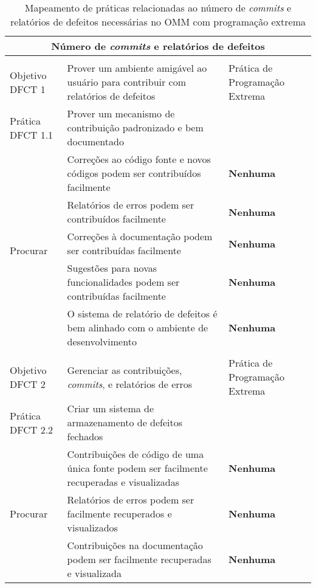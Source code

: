 \begin{longtable}{|p{2cm}|p{7cm}|p{7cm}|}
  \caption{Mapeamento de práticas relacionadas ao número de
    \textit{commits} e relatórios de defeitos necessárias
    no OMM com programação extrema} \\
  \multicolumn{3}{|c|}{\cellcolor[gray]{0.6} Número de
    \textit{commits} e relatórios de defeitos}\\
  \endhead
  & & \\
  \hline \cellcolor[gray]{0.6} Objetivo DFCT 1 & \cellcolor[gray]{0.6}
  Prover um ambiente amigável ao usuário para contribuir com
  relatórios de defeitos & Prática de Programação Extrema \\
  \hline \cellcolor[gray]{0.9} Prática DFCT 1.1 &
  \cellcolor[gray]{0.9} Prover um mecanismo de contribuição
  padronizado e bem documentado &
  \\
  \hline \multirow{5}{*}{Procurar} & Correções ao código fonte e novos
  códigos podem ser contribuídos facilmente &\textbf{Nenhuma} \\
  \cline{2-3} & Relatórios de erros podem ser contribuídos facilmente
  &\textbf{Nenhuma} \\
  \cline{2-3} & Correções à documentação podem ser contribuídas
  facilmente &\textbf{Nenhuma} \\
  \cline{2-3} & Sugestões para novas funcionalidades podem ser
  contribuídas facilmente &\textbf{Nenhuma} \\
  \cline{2-3} & O sistema de relatório de defeitos é bem alinhado com
  o ambiente de desenvolvimento &\textbf{Nenhuma} \\
  \hline
  & & \\
  \hline \cellcolor[gray]{0.6} Objetivo DFCT 2 & \cellcolor[gray]{0.6}
  Gerenciar as contribuições, \textit{commits}, e relatórios de erros
  & Prática de Programação Extrema \\
  \hline \cellcolor[gray]{0.9} Prática DFCT 2.2 &
  \cellcolor[gray]{0.9}
  Criar um sistema de armazenamento de defeitos fechados & \\
  \hline \multirow{4}{*}{Procurar} & Contribuições de código de uma
  única fonte podem ser facilmente recuperadas e visualizadas &
  \textbf{Nenhuma} \\
  \cline{2-3} & Relatórios de erros podem ser facilmente recuperados e
  visualizados &\textbf{Nenhuma} \\
  \cline{2-3} & Contribuições na documentação podem ser facilmente
  recuperadas e visualizada &\textbf{Nenhuma} \\

\end{longtable}
